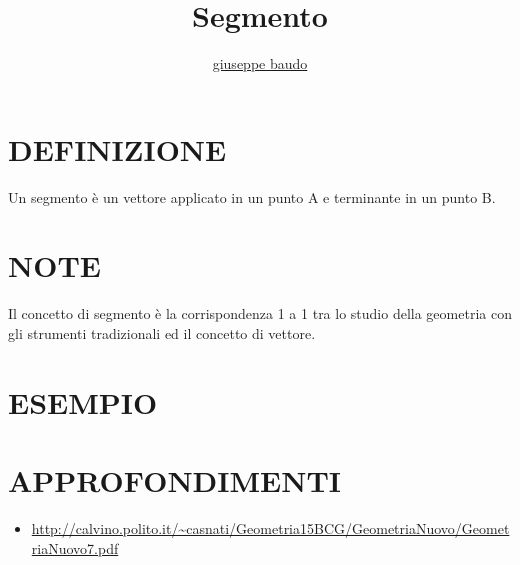 \documentclass[a4paper,10pt]{article}
\title{Segmento}
\author{\href{http://www.baudo.hol.es}{giuseppe baudo}}
\begin{document}
\maketitle

\section{DEFINIZIONE}
Un segmento è un vettore applicato in un punto A e terminante in un punto B.

\section{NOTE}
Il concetto di segmento è la corrispondenza 1 a 1 tra lo studio della geometria con gli strumenti tradizionali ed il concetto di vettore.


\section{ESEMPIO}

\section{APPROFONDIMENTI}
\begin{itemize}
 \item \url{http://calvino.polito.it/~casnati/Geometria15BCG/GeometriaNuovo/GeometriaNuovo7.pdf}
\end{itemize}
\end{document}
